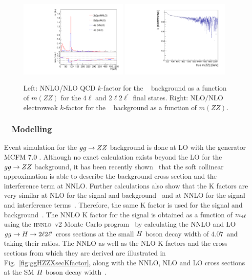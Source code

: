\begin{figure}[!htb]
\vspace*{0.3cm}
\begin{center}
\includegraphics[width=0.48\textwidth]{Figures/IrrBkg/Kfactor_qqZZ_mZZ.pdf}
\includegraphics[width=0.48\textwidth]{Figures/IrrBkg/K_ewk_qqZZ.pdf} 
\caption{Left: NNLO/NLO QCD $k$-factor for the \qqZZ~ background as a function of $m(ZZ)$ for the $4\ell$ and $2\ell2\ell^{\prime}$ final states. Right: NLO/NLO electroweak $k$-factor for the \qqZZ~ background as a function of $m(ZZ)$.
\label{fig:qqZZKfactor}}
\end{center}
\end{figure}


\subsubsection{\ggZZ~ Modelling}

Event simulation for the $gg\to ZZ$ background is done at LO with the generator MCFM 7.0 \cite{MCFM,Campbell:2011bn,Campbell:2013una}.
Although no exact calculation exists beyond the LO for the $gg\to ZZ$ background, 
it has been recently shown~\cite{Bonvini:1304.3053} 
that the soft collinear approximation is able to describe the background cross section and the 
interference term at NNLO\@. Further calculations also show that the K factors are very similar at NLO for the signal 
and background~\cite{Melnikov:2015laa} and at NNLO for the signal and interference terms~\cite{Li:2015jva}. Therefore, the same K factor 
is used for the signal and background~\cite{Passarino:1312.2397v1}. The NNLO K factor for the signal is obtained as a function of $m_{4\ell}$ 
using the \textsc{hnnlo}~v2 Monte Carlo program~\cite{Catani:2007vq,Grazzini:2008tf,Grazzini:2013mca} by calculating the NNLO and LO 
$gg\to H\to2\ell2\ell^\prime$ cross sections at the small $H$ boson decay width of $4.07$~\MeV and taking their ratios. The NNLO as 
well as the NLO K factors and the cross sections from which they are derived are illustrated in Fig.~\ref{fig:ggHZZXsecKfactor}, 
along with the NNLO, NLO and LO cross sections at the SM $H$ boson decay width~\cite{Heinemeyer:2013tqa}.
 
